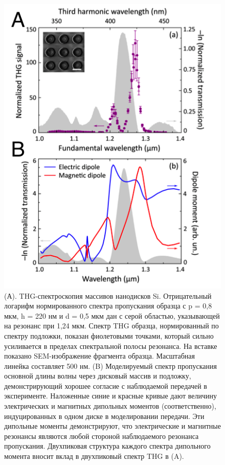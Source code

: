  \begin{figure}[h!]
	\centering
	\includegraphics[width=0.5\linewidth]{images/fig3.png}
	\caption{(А). THG-спектроскопия массивов нанодисков Si. Отрицательный логарифм нормированного спектра пропускания образца с p = 0,8 мкм, h = 220 нм и d = 0,5 мкм дан с серой областью, указывающей на резонанс при 1,24 мкм. Спектр THG образца, нормированный по спектру подложки, показан фиолетовыми точками, который сильно усиливается в пределах спектральной полосы резонанса. На вставке показано SEM-изображение фрагмента образца. Масштабная линейка составляет 500 нм. (B) Моделируемый спектр пропускания основной длины волны через дисковый массив и подложку, демонстрирующий хорошее согласие с наблюдаемой передачей в эксперименте. Наложенные синие и красные кривые дают величину электрических и магнитных дипольных моментов (соответственно), индуцированных в одном диске в моделировании передачи. Эти дипольные моменты демонстрируют, что электрические и магнитные резонансы являются любой стороной наблюдаемого резонанса пропускания. Двухпиковая структура каждого спектра дипольного момента вносит вклад в двухпиковый спектр THG в (A).}
	\label{nonliner:nanodisks}
\end{figure}
